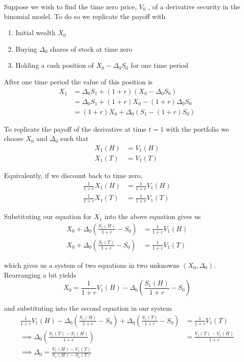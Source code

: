 \documentclass[12pt]{article}
\newlength\tindent
\renewcommand{\indent}{\hspace*{\tindent}}
\begin{document}
\indent Suppose we wish to find the time zero price, $V_0$ , of a derivative security in the binomial model. To do so we replicate the payoff with
\begin{enumerate}[]
	\item Initial wealth $X_0$
	\item Buying $\Delta_0$ shares of stock at time zero
	\item Holding a cash position of $X_0 - \Delta_0S_0$ for one time period
\end{enumerate}

After one time period the value of this position is
\begin{align*}
	X_1 &= \Delta_0S_1 + (1 + r)(X_0 - \Delta_0S_0) \\
	&= \Delta_0S_1 + (1 + r)X_0 - (1 + r)\Delta_0S_0 \\
	&= (1 + r)X_0 + \Delta_0(S_1 - (1 + r)S_0)
\end{align*}

\indent To replicate the payoff of the derivative at time $t = 1$ with the portfolio we choose $X_0$ and $\Delta_0$ such that
\begin{align*}
	X_1(H) &= V_1(H) \\
	X_1(T) &= V_1(T)
\end{align*}

Equivalently, if we discount back to time zero,
\begin{align*}
	\frac{1}{1 + r}X_1(H) &= \frac{1}{1 + r}V_1(H) \\
	\frac{1}{1 + r}X_1(T) &= \frac{1}{1 + r}V_1(T)
\end{align*}

Substituting our equation for $X_1$ into the above equation gives us
\begin{align*}
	X_0 + \Delta_0 \left( \frac{S_1(H)}{1 + r} - S_0 \right) &= \frac{1}{1 + r}V_1(H) \\
	X_0 + \Delta_0 \left( \frac{S_1(T)}{1 + r} - S_0 \right) &= \frac{1}{1 + r}V_1(T) 
\end{align*}

which gives us a system of two equations in two unknowns $(X_0, \Delta_0)$. Rearranging a bit yields
\begin{equation*}
	X_0 = \frac{1}{1 + r}V_1(H) - \Delta_0 \left( \frac{S_1(H)}{1 + r} - S_0 \right)
\end{equation*}

and substituting into the second equation in our system
\begin{align*}
	\frac{1}{1 + r}V_1(H) - \Delta_0 \left( \frac{S_1(H)}{1 + r} - S_0 \right) + \Delta_0 \left( \frac{S_1(T)}{1 + r} - S_0 \right) &= \frac{1}{1 + r}V_1(T) \\
	\implies \Delta_0 \left( \frac{S_1(T) - S_1(H)}{1 + r} \right) &= \frac{V_1(T) - V_1(H)}{1 + r} \\
	\implies \Delta_0 = \frac{V_1(H) - V_1(T)}{S_1(H) - S_1(T)}
\end{align*}
\end{document}
